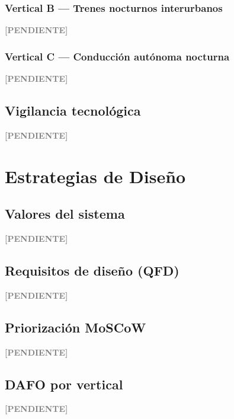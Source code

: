 \documentclass[12pt,a4paper]{article}
\newenvironment{pendiente}
  {\par\vspace{4pt}\noindent\textcolor{gray}{\textbf{[PENDIENTE]}}\par\begingroup\color{gray}\small}
  {\endgroup\par\vspace{4pt}}
\begin{document}
\subsubsection{Vertical B --- Trenes nocturnos interurbanos}
\begin{pendiente}
\end{pendiente}

\subsubsection{Vertical C --- Conducción autónoma nocturna}
\begin{pendiente}
\end{pendiente}

\subsection{Vigilancia tecnológica}
\begin{pendiente}
\end{pendiente}



\section{Estrategias de Diseño}

\subsection{Valores del sistema}
\begin{pendiente}
\end{pendiente}

\subsection{Requisitos de diseño (QFD)}
\begin{pendiente}
\end{pendiente}

\subsection{Priorización MoSCoW}
\begin{pendiente}
\end{pendiente}

\subsection{DAFO por vertical}
\begin{pendiente}
\end{pendiente}
\end{document}
